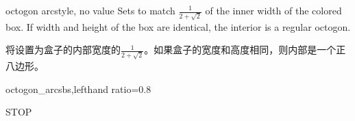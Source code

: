   \begin{docTcbKey}[][doc new=2015-05-05]{octogon arc}{}{style, no value}
  Sets  to match $\frac{1}{2+\sqrt{2}}$ of the inner width
  of the colored box. If width and height of the box are identical,
  the interior is a regular octogon.

将设置为盒子的内部宽度的$\frac{1}{2+\sqrt{2}}$。如果盒子的宽度和高度相同，则内部是一个正八边形。

\begin{exdispExample*}{octogon_arc}{sbs,lefthand ratio=0.8}
\begin{tcolorbox}[enhanced,%
size=minimal,%
auto outer arc,%
width=2.1cm,octogon arc,%
colback=red,%
colframe=white,%
colupper=white,%
fontupper=\fontsize{7mm}{7mm}\selectfont\bfseries\sffamily,
halign=center,valign=center,
square,%
arc is angular,%
borderline={0.2mm}{-1mm}{red}  ]%
STOP
\end{tcolorbox}
\end{exdispExample*}
\end{docTcbKey}




  

